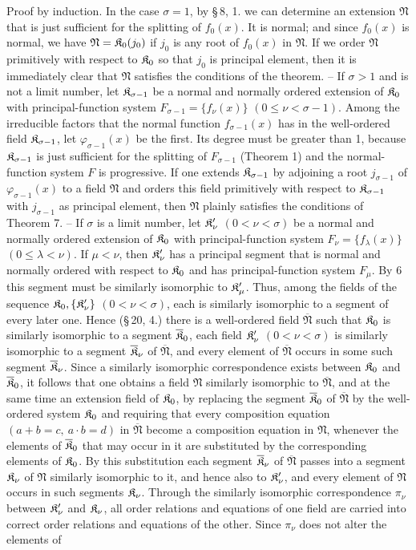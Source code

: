 Proof by induction. In the case $\sigma=1$, by \S\,8, 1. we can determine an extension $\mathfrak N$ that is just sufficient for the splitting of $f_0(x)$. It is normal; and since $f_0(x)$ is normal, we have $\mathfrak N=\mathfrak K_0(j_0)$ if $j_0$ is any root of $f_0(x)$ in $\mathfrak N$. If we order $\mathfrak N$ primitively with respect to $\mathfrak K_0$ so that $j_0$ is principal element, then it is immediately clear that $\mathfrak N$ satisfies the conditions of the theorem. -- If $\sigma>1$ and is not a limit number, let $\mathfrak K_{\sigma-1}$ be a normal and normally ordered extension of $\mathfrak K_0$ with principal-function system $F_{\sigma-1}=\{f_\nu(x)\}$ $(0\leq\nu<\sigma-1)$. Among the irreducible factors that the normal function $f_{\sigma-1}(x)$ has in the well-ordered field $\mathfrak K_{\sigma-1}$, let $\varphi_{\sigma-1}(x)$ be the first. Its degree must be greater than 1, because $\mathfrak K_{\sigma-1}$ is just sufficient for the splitting of $F_{\sigma-1}$ (Theorem 1) and the normal-function system $F$ is progressive. If one extends $\mathfrak K_{\sigma-1}$ by adjoining a root $j_{\sigma-1}$ of $\varphi_{\sigma-1}(x)$ to a field $\mathfrak N$ and orders this field primitively with respect to $\mathfrak K_{\sigma-1}$ with $j_{\sigma-1}$ as principal element, then $\mathfrak N$ plainly satisfies the conditions of Theorem 7. -- If $\sigma$ is a limit number, let $\mathfrak K_\nu'$ $(0<\nu<\sigma)$ be a normal and normally ordered extension of $\mathfrak K_0$ with principal-function system $F_\nu=\{f_\lambda(x)\}$ $(0\leq\lambda<\nu)$. If $\mu<\nu$, then $\mathfrak K_\nu'$ has a principal segment that is normal and normally ordered with respect to $\mathfrak K_0$ and has principal-function system $F_\mu$. By 6 this segment must be similarly isomorphic to $\mathfrak K_\mu'$. Thus, among the fields of the sequence $\mathfrak K_0,\{\mathfrak K_\nu'\}$ $(0<\nu<\sigma)$, each is similarly isomorphic to a segment of every later one. Hence (\S\,20, 4.) there is a well-ordered field $\overline{\mathfrak N}$ such that $\mathfrak K_0$ is similarly isomorphic to a segment $\overline{\mathfrak K}_0$, each field $\mathfrak K_\nu'$ $(0<\nu<\sigma)$ is similarly isomorphic to a segment $\overline{\mathfrak K}_\nu$ of $\overline{\mathfrak N}$, and every element of $\overline{\mathfrak N}$ occurs in some such segment $\overline{\mathfrak K}_\nu$. Since a similarly isomorphic correspondence exists between $\mathfrak K_0$ and $\overline{\mathfrak K}_0$, it follows that one obtains a field $\mathfrak N$ similarly isomorphic to $\overline{\mathfrak N}$, and at the same time an extension field of $\mathfrak K_0$, by replacing the segment $\overline{\mathfrak K}_0$ of $\overline{\mathfrak N}$ by the well-ordered system $\mathfrak K_0$ and requiring that every composition equation $(a+b=c,\ a\cdot b=d)$ in $\overline{\mathfrak N}$ become a composition equation in $\mathfrak N$, whenever the elements of $\overline{\mathfrak K}_0$ that may occur in it are substituted by the corresponding elements of $\mathfrak K_0$. By this substitution each segment $\overline{\mathfrak K}_\nu$ of $\overline{\mathfrak N}$ passes into a segment $\mathfrak K_\nu$ of $\mathfrak N$ similarly isomorphic to it, and hence also to $\mathfrak K_\nu'$, and every element of $\mathfrak N$ occurs in such segments $\mathfrak K_\nu$. Through the similarly isomorphic correspondence $\pi_\nu$ between $\mathfrak K_\nu'$ and $\mathfrak K_\nu$, all order relations and equations of one field are carried into correct order relations and equations of the other. Since $\pi_\nu$ does not alter the elements of 